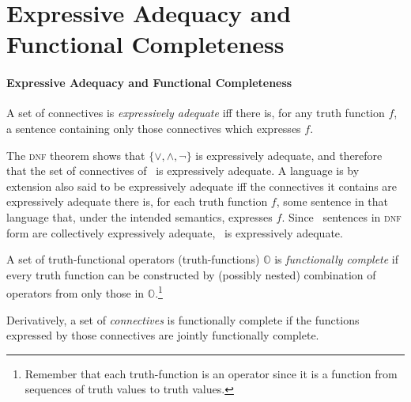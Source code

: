 \section{Expressive Adequacy and Functional Completeness} \label{expressiveadeq}
\paragraph{Expressive Adequacy and Functional Completeness}
\begin{definition}
	A set of connectives is \emph{expressively adequate} iff there is, for any truth function $f$, a sentence containing only those connectives which expresses $f$.
\end{definition}
 The \textsc{\lowercase{DNF}} theorem shows that $\{\vee,\wedge,\neg\}$ is expressively adequate, and therefore that the set of connectives of \lone\ is expressively adequate. A language is by extension also said to be expressively adequate iff the connectives it contains are expressively adequate there is, for each truth function $f$, some sentence in that language that, under the intended semantics, expresses $f$. Since \lone\ sentences in \textsc{dnf} form are collectively expressively adequate, \lone\ is expressively adequate.

\begin{definition}
	A set of truth-functional operators (truth-functions) $\mathbb{O}$ is \emph{functionally complete} if every truth function can be constructed by (possibly nested) combination of operators from only those in $\mathbb{O}$.\footnote{Remember that each truth-function is an operator since it is a function from sequences of truth values to truth values.}
\end{definition} Derivatively, a set of \emph{connectives} is functionally complete if the functions expressed by those connectives are jointly functionally complete.

